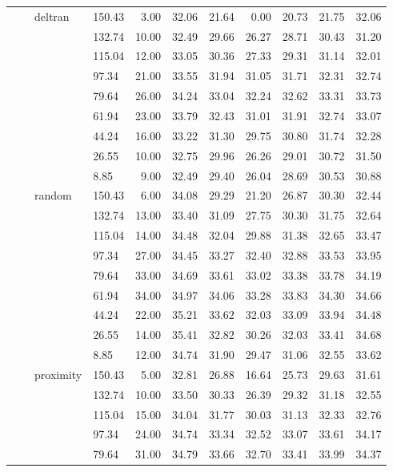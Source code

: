 \begin{longtable}{llllrrrrrrr}
   &  & deltran & 150.43 & 3.00 & 32.06 & 21.64 & 0.00 & 20.73 & 21.75 & 32.06 \\ 
   &  &  & 132.74 & 10.00 & 32.49 & 29.66 & 26.27 & 28.71 & 30.43 & 31.20 \\ 
   &  &  & 115.04 & 12.00 & 33.05 & 30.36 & 27.33 & 29.31 & 31.14 & 32.01 \\ 
   &  &  & 97.34 & 21.00 & 33.55 & 31.94 & 31.05 & 31.71 & 32.31 & 32.74 \\ 
   &  &  & 79.64 & 26.00 & 34.24 & 33.04 & 32.24 & 32.62 & 33.31 & 33.73 \\ 
   &  &  & 61.94 & 23.00 & 33.79 & 32.43 & 31.01 & 31.91 & 32.74 & 33.07 \\ 
   &  &  & 44.24 & 16.00 & 33.22 & 31.30 & 29.75 & 30.80 & 31.74 & 32.28 \\ 
   &  &  & 26.55 & 10.00 & 32.75 & 29.96 & 26.26 & 29.01 & 30.72 & 31.50 \\ 
   &  &  & 8.85 & 9.00 & 32.49 & 29.40 & 26.04 & 28.69 & 30.53 & 30.88 \\ 
   &  & random & 150.43 & 6.00 & 34.08 & 29.29 & 21.20 & 26.87 & 30.30 & 32.44 \\ 
   &  &  & 132.74 & 13.00 & 33.40 & 31.09 & 27.75 & 30.30 & 31.75 & 32.64 \\ 
   &  &  & 115.04 & 14.00 & 34.48 & 32.04 & 29.88 & 31.38 & 32.65 & 33.47 \\ 
   &  &  & 97.34 & 27.00 & 34.45 & 33.27 & 32.40 & 32.88 & 33.53 & 33.95 \\ 
   &  &  & 79.64 & 33.00 & 34.69 & 33.61 & 33.02 & 33.38 & 33.78 & 34.19 \\ 
   &  &  & 61.94 & 34.00 & 34.97 & 34.06 & 33.28 & 33.83 & 34.30 & 34.66 \\ 
   &  &  & 44.24 & 22.00 & 35.21 & 33.62 & 32.03 & 33.09 & 33.94 & 34.48 \\ 
   &  &  & 26.55 & 14.00 & 35.41 & 32.82 & 30.26 & 32.03 & 33.41 & 34.68 \\ 
   &  &  & 8.85 & 12.00 & 34.74 & 31.90 & 29.47 & 31.06 & 32.55 & 33.62 \\ 
   &  & proximity & 150.43 & 5.00 & 32.81 & 26.88 & 16.64 & 25.73 & 29.63 & 31.61 \\ 
   &  &  & 132.74 & 10.00 & 33.50 & 30.33 & 26.39 & 29.32 & 31.18 & 32.55 \\ 
   &  &  & 115.04 & 15.00 & 34.04 & 31.77 & 30.03 & 31.13 & 32.33 & 32.76 \\ 
   &  &  & 97.34 & 24.00 & 34.74 & 33.34 & 32.52 & 33.07 & 33.61 & 34.17 \\ 
   &  &  & 79.64 & 31.00 & 34.79 & 33.66 & 32.70 & 33.41 & 33.99 & 34.37 \\ 

\end{longtable}
